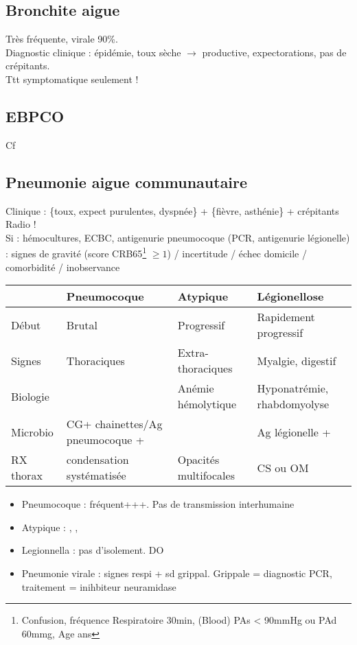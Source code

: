 \subsection{Bronchite aigue}
Très fréquente, virale 90\%. \\
Diagnostic clinique : épidémie, toux sèche \(\to\) productive, expectorations,
pas de crépitants.\\
Ttt symptomatique seulement !

\subsection{EBPCO} Cf~

\subsection{Pneumonie aigue communautaire}
Clinique : \{toux, expect purulentes, dyspnée\} + \{fièvre, asthénie\} +
crépitants\\
Radio !\\
Si \faHospitalO : hémocultures, ECBC, antigenurie pneumocoque (\pm PCR,
antigenurie légionelle)\\
\faHospitalO : signes de gravité (score CRB65\footnote{Confusion, fréquence
  Respiratoire \ge 30min, (Blood) PAs < 90mmHg ou PAd \ge 60mmg, Age  ans}
\(\ge 1\)) / incertitude / échec domicile / comorbidité / inobservance

\begin{table}[htpb]
  \centering
  \label{Orientation clinique (non discriminant !)}
  \begin{tabular}{llll}
    \toprule
    & Pneumocoque & Atypique & Légionellose\\
    \midrule
    Début & Brutal & Progressif & Rapidement progressif\\
    Signes & Thoraciques & Extra-thoraciques & Myalgie, digestif\\
    Biologie &  & Anémie hémolytique & Hyponatrémie, rhabdomyolyse\\
    Microbio & CG+ chainettes/Ag pneumocoque + &  & Ag légionelle +\\
    RX thorax & condensation systématisée & Opacités multifocales & CS ou OM\\
    \bottomrule
  \end{tabular}
\end{table}

\begin{itemize}
\item Pneumocoque : fréquent+++. Pas de transmission interhumaine
\item Atypique : , , 
\item Legionnella : pas d'isolement. DO
\item Pneumonie virale : signes respi + sd grippal. Grippale = diagnostic PCR, traitement = inihbiteur neuramidase \danger {}
\end{itemize}
